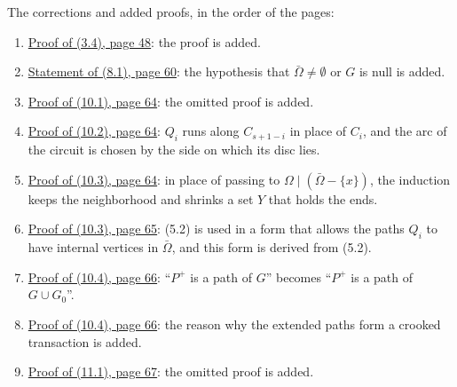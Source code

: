 The corrections and added proofs, in the order of the pages:
\begin{enumerate}\setlength{\itemsep}{1pt}
\item {}\hyperref[fix:3.4-proof-added]{Proof of (3.4), page 48}: the proof is added.
\item {}\hyperref[fix:8.1]{Statement of (8.1), page 60}: the hypothesis that $\bar{\Omega}\neq\emptyset$ or $G$ is null is added.
\item {}\hyperref[fix:10.1-proof-added]{Proof of (10.1), page 64}: the omitted proof is added.
\item {}\hyperref[fix:10.2-proof]{Proof of (10.2), page 64}: $Q_i$ runs along $C_{s+1-i}$ in place of $C_i$, and the arc of the circuit is chosen by the side on which its disc lies.
\item {}\hyperref[fix:10.3-rural]{Proof of (10.3), page 64}: in place of passing to $\Omega\mid(\bar{\Omega}-\{x\})$, the induction keeps the neighborhood and shrinks a set $Y$ that holds the ends.
\item {}\hyperref[fix:10.3-proof]{Proof of (10.3), page 65}: (5.2) is used in a form that allows the paths $Q_i$ to have internal vertices in $\bar{\Omega}$, and this form is derived from (5.2).
\item {}\hyperref[fix:10.4-path]{Proof of (10.4), page 66}: ``$P^+$ is a path of $G$'' becomes ``$P^+$ is a path of $G \cup G_0$''.
\item {}\hyperref[fix:10.4-proof-added]{Proof of (10.4), page 66}: the reason why the extended paths form a crooked transaction is added.
\item {}\hyperref[fix:11.1-proof-added]{Proof of (11.1), page 67}: the omitted proof is added.
\end{enumerate}
